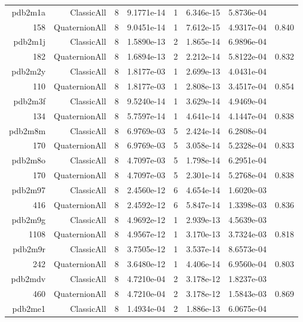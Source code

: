 \begin{xltabular}{\textwidth}{r|rcS[table-format=1.4e+2]cS[table-format=1.3e+2]S[table-format=1.4e+2]S[table-format=-1.3]}
pdb2m1a & ClassicAll & 8 & 9.1771e-14 & 1 & 6.346e-15 & 5.8736e-04 & \\
158 & QuaternionAll & 8 & 9.0451e-14 & 1 & 7.612e-15 & 4.9317e-04 & 0.840\\  \addlinespace
pdb2m1j & ClassicAll & 8 & 1.5890e-13 & 2 & 1.865e-14 & 6.9896e-04 & \\
182 & QuaternionAll & 8 & 1.6894e-13 & 2 & 2.212e-14 & 5.8122e-04 & 0.832\\  \addlinespace
pdb2m2y & ClassicAll & 8 & 1.8177e-03 & 1 & 2.699e-13 & 4.0431e-04 & \\
110 & QuaternionAll & 8 & 1.8177e-03 & 1 & 2.808e-13 & 3.4517e-04 & 0.854\\  \addlinespace
pdb2m3f & ClassicAll & 8 & 9.5240e-14 & 1 & 3.629e-14 & 4.9469e-04 & \\
134 & QuaternionAll & 8 & 5.7597e-14 & 1 & 4.641e-14 & 4.1447e-04 & 0.838\\  \addlinespace
pdb2m8m & ClassicAll & 8 & 6.9769e-03 & 5 & 2.424e-14 & 6.2808e-04 & \\
170 & QuaternionAll & 8 & 6.9769e-03 & 5 & 3.058e-14 & 5.2328e-04 & 0.833\\  \addlinespace
pdb2m8o & ClassicAll & 8 & 4.7097e-03 & 5 & 1.798e-14 & 6.2951e-04 & \\
170 & QuaternionAll & 8 & 4.7097e-03 & 5 & 2.301e-14 & 5.2768e-04 & 0.838\\  \addlinespace
pdb2m97 & ClassicAll & 8 & 2.4560e-12 & 6 & 4.654e-14 & 1.6020e-03 & \\
416 & QuaternionAll & 8 & 2.4592e-12 & 6 & 5.847e-14 & 1.3398e-03 & 0.836\\  \addlinespace
pdb2m9g & ClassicAll & 8 & 4.9692e-12 & 1 & 2.939e-13 & 4.5639e-03 & \\
1108 & QuaternionAll & 8 & 4.9567e-12 & 1 & 3.170e-13 & 3.7324e-03 & 0.818\\  \addlinespace
pdb2m9r & ClassicAll & 8 & 3.7505e-12 & 1 & 3.537e-14 & 8.6573e-04 & \\
242 & QuaternionAll & 8 & 3.6480e-12 & 1 & 4.406e-14 & 6.9560e-04 & 0.803\\  \addlinespace
pdb2mdv & ClassicAll & 8 & 4.7210e-04 & 2 & 3.178e-12 & 1.8237e-03 & \\
460 & QuaternionAll & 8 & 4.7210e-04 & 2 & 3.178e-12 & 1.5843e-03 & 0.869\\  \addlinespace
pdb2me1 & ClassicAll & 8 & 1.4934e-04 & 2 & 1.886e-13 & 6.0675e-04 & \\

\end{xltabular}

